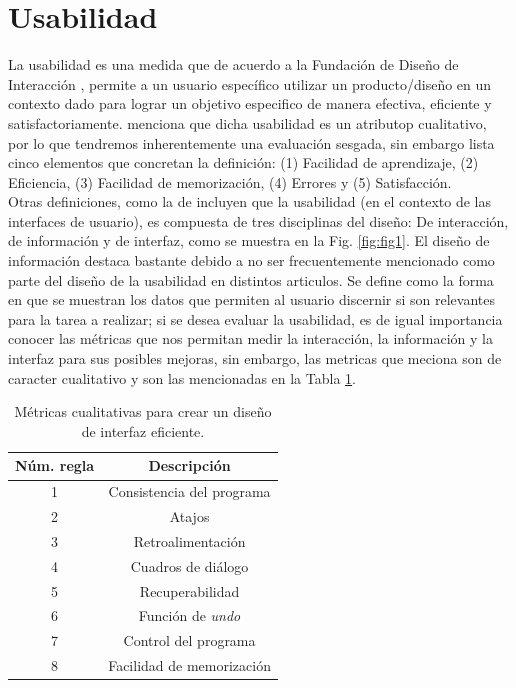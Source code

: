 \section{Usabilidad}
La usabilidad es una medida que de acuerdo a la Fundación de Diseño de Interacción \cite{unknown-author-no-dateC}, %
permite a un usuario específico utilizar un producto/diseño en un contexto dado para lograr
un objetivo especifico de manera efectiva, eficiente y satisfactoriamente. \cite{unknown-author-no-dateB} menciona %
que dicha usabilidad es un atributop cualitativo, por lo que tendremos inherentemente una
evaluación sesgada, sin embargo lista cinco elementos que concretan la definición:
(1) Facilidad de aprendizaje, (2) Eficiencia, (3) Facilidad de memorización, (4) Errores 
y (5) Satisfacción.
\\

Otras definiciones, como la de \cite{guntupalli-no-date} %
incluyen que la usabilidad (en el contexto de las interfaces de usuario),
es compuesta de tres disciplinas del diseño: De interacción, de información y de 
interfaz, como se muestra en la Fig. \ref{fig:fig1}. El diseño de información destaca
bastante debido a no ser frecuentemente mencionado como parte del diseño de la usabilidad
en distintos articulos. Se define como la forma en que se muestran los datos que permiten 
al usuario discernir si son relevantes para la tarea a realizar; si se desea evaluar la usabilidad,
es de igual importancia conocer las métricas que nos permitan medir la interacción, la información
y la interfaz para sus posibles mejoras, sin embargo, las metricas que meciona son de caracter 
cualitativo y son las mencionadas en la Tabla \ref{tab1}.
\begin{table}[t]
    \caption{Métricas cualitativas para crear un diseño de interfaz eficiente.}
    \begin{center}
        \begin{tabular}{c c}
        \hline
        \textbf{Núm. regla} & \textbf{Descripción}\\
        \hline
        1 & Consistencia del programa\\
        2 & Atajos\\
        3 & Retroalimentación\\
        4 & Cuadros de diálogo\\
        5 & Recuperabilidad\\
        6 & Función de \emph{undo}\\
        7 & Control del programa\\
        8 & Facilidad de memorización\\
        \hline
        \end{tabular}
    \end{center}
    \label{tab1}
\end{table}
\\

